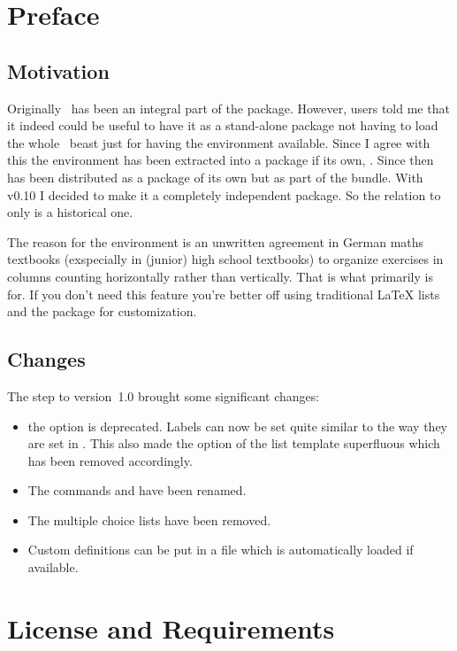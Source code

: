 \documentclass[load-preamble+]{cnltx-doc}
\begin{document}
\section{Preface}
\subsection{Motivation}
Originally \Tasks\ has been an integral part of the
\ExSheets{} package.  However, users told me that it indeed
could be useful to have it as a stand-alone package not having to load the
whole \ExSheets\ beast just for having the  environment available.
Since I agree with this the environment has been extracted into a package if
its own, \Tasks.  Since then \Tasks{} has been distributed as a package of its
own but as part of the \ExSheets{} bundle.  With v0.10 I
decided to make it a completely independent package.  So the relation to
\ExSheets{} only is a historical one.

The reason for the  environment is an unwritten agreement in German
maths textbooks (exspecially in (junior) high school textbooks) to organize
exercises in columns counting horizontally rather than vertically.  That is
what  primarily is for. If you don't need this feature you're
better off using traditional \LaTeX{} lists and the  package for
customization.

\subsection{Changes}
The  step to version~1.0 brought some significant changes:
\begin{itemize}
  \item the option  is deprecated.  Labels can now be
    set quite similar to the way they are set in .  This also
    made the  option of the list template superfluous which has
    been removed accordingly.
  \item The commands  and  have been renamed.
  \item The multiple choice lists have been removed.
  \item Custom definitions can be put in a  file which is
    automatically loaded if available.
\end{itemize}

\section{License and Requirements}\label{sec:license}
\license
\end{document}
